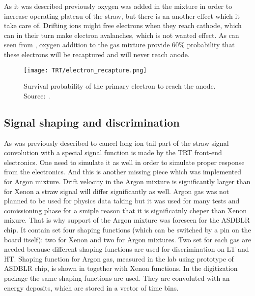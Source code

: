 As it was described previously oxygen was added in the mixture in order to increase operating plateau of the straw, but there is an another effect which it take care of.
Drifting ions might free electrons when they reach cathode, which can in their turn make electron avalanches, which is not wanted effect.
As can seen from , oxygen addition to the gas mixture provide 60$\%$ probability that these electrons will be recaptured 
and will never reach anode. 

\begin{figure}
\centering
\texttt{[image: TRT/electron\_recapture.png]}
\caption{ 
 Survival probability of the primary electron to reach the anode. Source:~\cite{esben_thesis}.
}
\label{fig:electron_recapture}
\end{figure}

\subsection{Signal shaping and discrimination}


As was previously described to cancel long ion tail part of the straw signal convolution with a special signal function is made by the TRT front-end electronics.
One need to simulate it as well in order to simulate proper response from the electronics. 
And this is another missing piece which was implemented for Argon mixture. 
Drift velocity in the Argon mixture is significantly larger than for Xenon a straw signal will differ significantly as well.
Argon gas was not planned to be used for physics data taking but it was used for many tests and comissioning phase for a smiple reason that it is significatnly
cheper than Xenon mixure. That is why support of the Argon mixture was foreseen for the ASDBLR chip. It contain set four shaping functions (which can be switched
by a pin on the board itself): two for Xenon and two for Argon mixtures. Two set for each gas are needed because different shaping functions are used for discrimination
on LT and HT. Shaping function for Argon gas, measured in the lab using prototype of ASDBLR chip, is shown in  together with Xenon functions.
In the digitization package the same shaping functions are used. They are convoluted with an energy deposits, which are stored in a vector of time bins.

